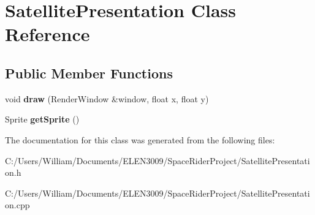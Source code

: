 \hypertarget{class_satellite_presentation}{}\section{Satellite\+Presentation Class Reference}
\label{class_satellite_presentation}
\subsection*{Public Member Functions}
\begin{DoxyCompactItemize}
\item 
\mbox{\label{class_satellite_presentation_a140fccb83267f6f7794b26b5deda346f}} 
void {\bfseries draw} (Render\+Window \&window, float x, float y)
\item 
\mbox{\label{class_satellite_presentation_ac30edf373faa3704877688882e1feb3b}} 
Sprite {\bfseries get\+Sprite} ()
\end{DoxyCompactItemize}


The documentation for this class was generated from the following files\+:\begin{DoxyCompactItemize}
\item 
C\+:/\+Users/\+William/\+Documents/\+E\+L\+E\+N3009/\+Space\+Rider\+Project/Satellite\+Presentation.\+h\item 
C\+:/\+Users/\+William/\+Documents/\+E\+L\+E\+N3009/\+Space\+Rider\+Project/Satellite\+Presentation.\+cpp\end{DoxyCompactItemize}
